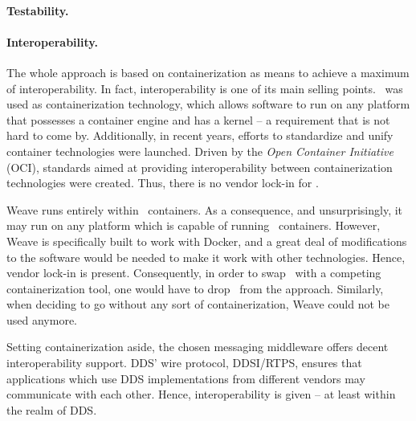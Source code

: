 \paragraph{Testability.}


\paragraph{Interoperability.}
The whole approach is based on containerization as means to achieve a maximum of interoperability. In fact, interoperability is one of its main selling points. \docker\ was used as containerization technology, which allows software to run on any platform that possesses a container engine and has a kernel -- a requirement that is not hard to come by. Additionally, in recent years, efforts to standardize and unify container technologies were launched. Driven by the \emph{Open Container Initiative} (OCI), standards aimed at providing interoperability between containerization technologies were created. Thus, there is no vendor lock-in for \docker .

Weave runs entirely within \docker\ containers. As a consequence, and unsurprisingly, it may run on any platform which is capable of running \docker\ containers. However, Weave is specifically built to work with Docker, and a great deal of modifications to the software would be needed to make it work with other technologies. Hence, vendor lock-in is present. Consequently, in order to swap \docker\ with a competing containerization tool, one would have to drop \wnet\ from the approach. Similarly, when deciding to go without any sort of containerization, Weave could not be used anymore.

Setting containerization aside, the chosen messaging middleware offers decent interoperability support. DDS' wire protocol, DDSI/RTPS, ensures that applications which use DDS implementations from different vendors may communicate with each other. Hence, interoperability is given -- at least within the realm of DDS. 




